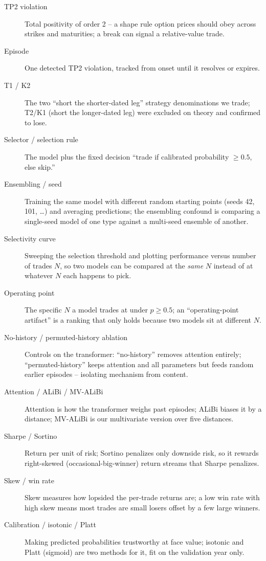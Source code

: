 \documentclass[11pt]{article}
\begin{document}
\begin{description}
\item[TP2 violation] Total positivity of order 2 -- a shape rule option prices should obey across strikes and maturities; a break can signal a relative-value trade.
\item[Episode] One detected TP2 violation, tracked from onset until it resolves or expires.
\item[T1 / K2] The two ``short the shorter-dated leg'' strategy denominations we trade; T2/K1 (short the longer-dated leg) were excluded on theory and confirmed to lose.
\item[Selector / selection rule] The model plus the fixed decision ``trade if calibrated probability $\ge 0.5$, else skip.''
\item[Ensembling / seed] Training the same model with different random starting points (seeds 42, 101, \dots) and averaging predictions; the ensembling confound is comparing a single-seed model of one type against a multi-seed ensemble of another.
\item[Selectivity curve] Sweeping the selection threshold and plotting performance versus number of trades $N$, so two models can be compared at the \emph{same} $N$ instead of at whatever $N$ each happens to pick.
\item[Operating point] The specific $N$ a model trades at under $p\ge0.5$; an ``operating-point artifact'' is a ranking that only holds because two models sit at different $N$.
\item[No-history / permuted-history ablation] Controls on the transformer: ``no-history'' removes attention entirely; ``permuted-history'' keeps attention and all parameters but feeds random earlier episodes -- isolating mechanism from content.
\item[Attention / ALiBi / MV-ALiBi] Attention is how the transformer weighs past episodes; ALiBi biases it by a distance; MV-ALiBi is our multivariate version over five distances.
\item[Sharpe / Sortino] Return per unit of risk; Sortino penalizes only downside risk, so it rewards right-skewed (occasional-big-winner) return streams that Sharpe penalizes.
\item[Skew / win rate] Skew measures how lopsided the per-trade returns are; a low win rate with high skew means most trades are small losers offset by a few large winners.
\item[Calibration / isotonic / Platt] Making predicted probabilities trustworthy at face value; isotonic and Platt (sigmoid) are two methods for it, fit on the validation year only.

\end{description}
\end{document}
